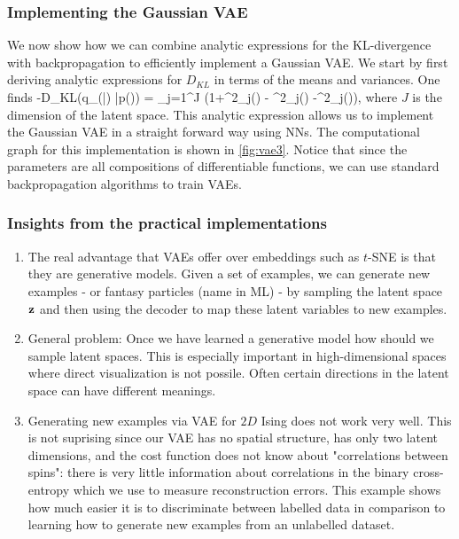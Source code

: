 \subsubsection{Implementing the Gaussian VAE}
We now show how we can combine analytic expressions for the KL-divergence with backpropagation to efficiently implement a Gaussian VAE. We start by first deriving analytic expressions for $D_{KL}$ in terms of the means and variances. One finds
\be 
\label{eq:vaeKLgaussian}
-D_{KL}(q_\phi(\mz |\mx) |p(\mz)) = \half \sum_{j=1}^J (1+\log \sigma^2_j(\mx) - \mu^2_j(\mx) -\sigma^2_j(\mx)),
\ee 
where $J$ is the dimension of the latent space.
This analytic expression allows us to implement the Gaussian VAE in a straight forward way using NNs. The computational graph for this implementation is shown in \ref{fig:vae3}. Notice that since the parameters are all compositions of differentiable functions, we can use standard backpropagation algorithms to train VAEs.

\subsubsection{Insights from the practical implementations}
\begin{enumerate}
\item The real advantage that VAEs offer over embeddings such as $t$-SNE is that they are generative models. Given a set of examples, we can generate new examples - or fantasy particles (name in ML) - by sampling the latent space $\mathbf{z}$ and then using the decoder to map these latent variables to new examples.\\
\item General problem: Once we have learned a generative model how should we sample latent spaces. This is especially important in high-dimensional spaces where direct visualization is not possile. Often certain directions in the latent space can have different meanings.
\item Generating new examples via VAE for $2D$ Ising does not work very well. This is not suprising since our VAE has no spatial structure, has only two latent dimensions, and the cost function does not know about "correlations between spins": there is very little information about correlations in the binary cross-entropy which we use to measure reconstruction errors. This example shows how much easier it is to discriminate between labelled data in comparison to learning how to generate new examples from an unlabelled dataset. 
\end{enumerate}

